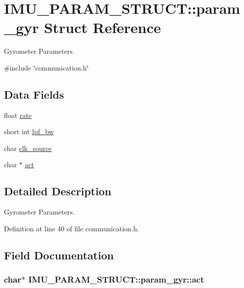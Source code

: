 \hypertarget{structIMU__PARAM__STRUCT_1_1param__gyr}{\section{I\-M\-U\-\_\-\-P\-A\-R\-A\-M\-\_\-\-S\-T\-R\-U\-C\-T\-:\-:param\-\_\-gyr Struct Reference}
\label{structIMU__PARAM__STRUCT_1_1param__gyr}
}


Gyrometer Parameters.  




{\ttfamily \#include \char`\"{}communication.\-h\char`\"{}}

\subsection*{Data Fields}
\begin{DoxyCompactItemize}
\item 
float \hyperlink{structIMU__PARAM__STRUCT_1_1param__gyr_a5aa70e1e9634411c89aacfbc570cc91c}{rate}
\item 
short int \hyperlink{structIMU__PARAM__STRUCT_1_1param__gyr_aa612f7299b43a1bf1fc597688c2fa02d}{lpf\-\_\-bw}
\item 
char \hyperlink{structIMU__PARAM__STRUCT_1_1param__gyr_aca3b791cb480f2da4703d4c256a7de48}{clk\-\_\-source}
\item 
char $\ast$ \hyperlink{structIMU__PARAM__STRUCT_1_1param__gyr_a909d153e794ec443be04625ce00e4178}{act}
\end{DoxyCompactItemize}


\subsection{Detailed Description}
Gyrometer Parameters. 

Definition at line 40 of file communication.\-h.



\subsection{Field Documentation}
\hypertarget{structIMU__PARAM__STRUCT_1_1param__gyr_a909d153e794ec443be04625ce00e4178}{
\subsubsection[{act}]{\setlength{\rightskip}{0pt plus 5cm}char$\ast$ I\-M\-U\-\_\-\-P\-A\-R\-A\-M\-\_\-\-S\-T\-R\-U\-C\-T\-::param\-\_\-gyr\-::act}}\label{structIMU__PARAM__STRUCT_1_1param__gyr_a909d153e794ec443be04625ce00e4178}


